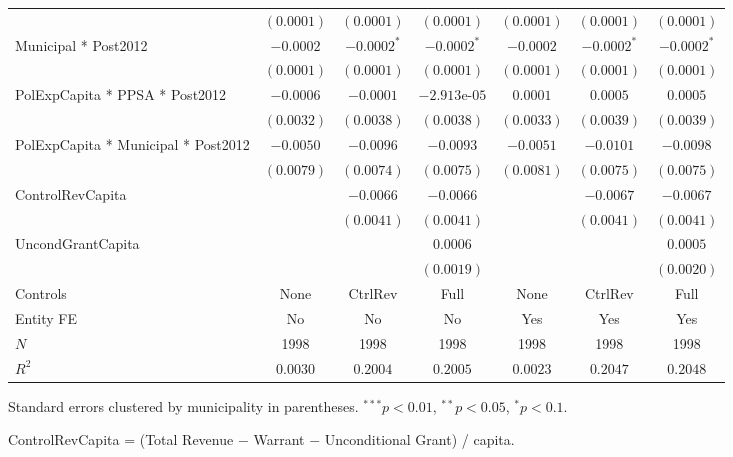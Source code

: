 \documentclass[border=10pt,varwidth=25cm]{standalone}
\renewenvironment{table}[1][]{}{}
\begin{document}
\begin{table}[H]
\begin{minipage}{\textwidth}
\begin{tabular}{lcccccc}
         & $(0.0001)$ & $(0.0001)$ & $(0.0001)$ & $(0.0001)$ & $(0.0001)$ & $(0.0001)$ \\[4pt]
        Municipal * Post2012 & $-0.0002$ & $-0.0002^{*}$ & $-0.0002^{*}$ & $-0.0002$ & $-0.0002^{*}$ & $-0.0002^{*}$ \\
         & $(0.0001)$ & $(0.0001)$ & $(0.0001)$ & $(0.0001)$ & $(0.0001)$ & $(0.0001)$ \\[4pt]
        PolExpCapita * PPSA * Post2012 & $-0.0006$ & $-0.0001$ & $-2.913\text{e-}05$ & $0.0001$ & $0.0005$ & $0.0005$ \\
         & $(0.0032)$ & $(0.0038)$ & $(0.0038)$ & $(0.0033)$ & $(0.0039)$ & $(0.0039)$ \\[4pt]
        PolExpCapita * Municipal * Post2012 & $-0.0050$ & $-0.0096$ & $-0.0093$ & $-0.0051$ & $-0.0101$ & $-0.0098$ \\
         & $(0.0079)$ & $(0.0074)$ & $(0.0075)$ & $(0.0081)$ & $(0.0075)$ & $(0.0075)$ \\[4pt]
        ControlRevCapita &  & $-0.0066$ & $-0.0066$ &  & $-0.0067$ & $-0.0067$ \\
         &  & $(0.0041)$ & $(0.0041)$ &  & $(0.0041)$ & $(0.0041)$ \\[4pt]
        UncondGrantCapita &  &  & $0.0006$ &  &  & $0.0005$ \\
         &  &  & $(0.0019)$ &  &  & $(0.0020)$ \\[4pt]
        \midrule
        Controls & None & CtrlRev & Full & None & CtrlRev & Full \\
        Entity FE & No & No & No & Yes & Yes & Yes \\
        $N$ & 1998 & 1998 & 1998 & 1998 & 1998 & 1998 \\
        $R^2$ & $0.0030$ & $0.2004$ & $0.2005$ & $0.0023$ & $0.2047$ & $0.2048$ \\
        \bottomrule
    \end{tabular}

    \vspace{6pt}
    {\scriptsize Standard errors clustered by municipality in parentheses. $^{***}p<0.01$, $^{**}p<0.05$, $^{*}p<0.1$.}

    {\scriptsize ControlRevCapita = (Total Revenue $-$ Warrant $-$ Unconditional Grant) / capita.}
    \end{minipage}
\end{table}
\end{document}
